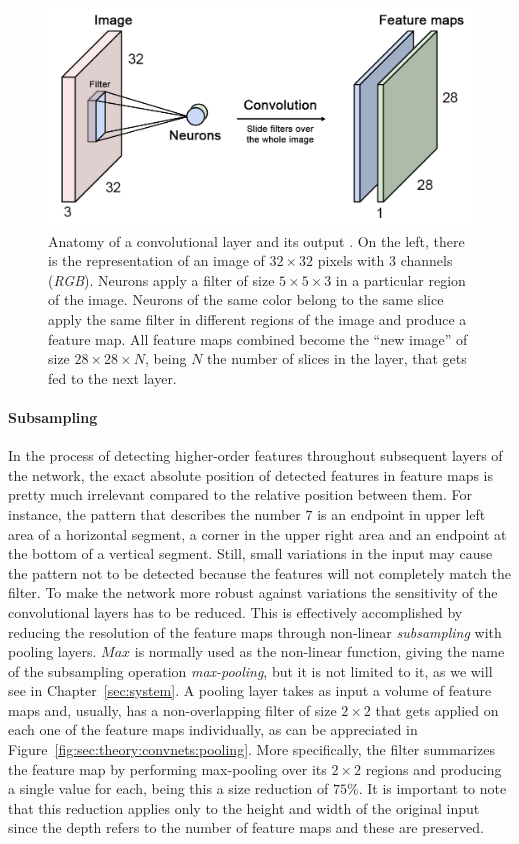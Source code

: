 \begin{figure}[htb]
  \includegraphics[width=\textwidth]{gfx/conv-layer-2}
  \caption{Anatomy of a convolutional layer and its output \cite{Guerzhoy2016}.
    On the left, there is the representation of an image of ${32}\times{32}$ pixels with $3$ channels (\emph{RGB}).
    Neurons apply a filter of size ${5}\times{5}\times{3}$ in a particular region of the image.
    Neurons of the same color belong to the same slice apply the same filter in different regions of the image and produce a feature map.
    All feature maps combined become the ``new image'' of size ${28}\times{28}\times{N}$, being $N$ the number of slices in the layer, that gets fed to the next layer.}
  \label{fig:sec:theory:conv-layer-2}
\end{figure}

\paragraph{Subsampling}
In the process of detecting higher-order features throughout subsequent layers of the network, the exact absolute position of detected features in feature maps is pretty much irrelevant compared to the relative position between them.
For instance, the pattern that describes the number $7$ is an endpoint in upper left area of a horizontal segment, a corner in the upper right area and an endpoint at the bottom of a vertical segment.
Still, small variations in the input may cause the pattern not to be detected because the features will not completely match the filter.
To make the network more robust against variations the sensitivity of the convolutional layers has to be reduced.
This is effectively accomplished by reducing the resolution of the feature maps through non-linear \emph{subsampling} with pooling layers.
$Max$ is normally used as the non-linear function, giving the name of the subsampling operation \emph{max-pooling}, but it is not limited to it, as we will see in Chapter~\ref{sec:system}.
A pooling layer takes as input a volume of feature maps and, usually, has a non-overlapping filter of size ${2}\times{2}$ that gets applied on each one of the feature maps individually, as can be appreciated in Figure~\ref{fig:sec:theory:convnets:pooling}.
More specifically, the filter summarizes the feature map by performing max-pooling over its ${2}\times{2}$ regions and producing a single value for each, being this a size reduction of $75\%$.
It is important to note that this reduction applies only to the height and width of the original input since the depth refers to the number of feature maps and these are preserved.

